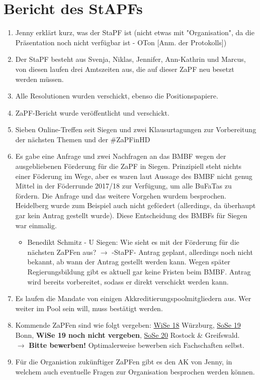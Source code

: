 \section{Bericht des StAPFs}
  \begin{enumerate}
    \item Jenny erklärt kurz, was der StaPF ist (nicht etwas mit "Organisation", da die Präsentation noch nicht verfügbar ist - OTon [Anm. der Protokolls])
    \item Der StaPF besteht aus Svenja, Niklas, Jennifer, Ann-Kathrin und Marcus, von diesen laufen drei Amtszeiten aus, die auf dieser ZaPF neu besetzt werden müssen.
    \item Alle Resolutionen wurden verschickt, ebenso die Positionspapiere.
    \item ZaPF-Bericht wurde veröffentlicht und verschickt.
    \item Sieben Online-Treffen seit Siegen und zwei Klausurtagungen zur Vorbereitung der nächsten Themen und der \#ZaPFinHD
    \item Es gabe eine Anfrage und zwei Nachfragen an das BMBF wegen der ausgebliebenen Förderung für die ZaPF in Siegen. Prinzipiell steht nichts einer Föderung im Wege,
      aber es waren laut Aussage des BMBF nicht genug Mittel in der Föderrunde 2017/18 zur Verfügung, um alle BuFaTas zu fördern. Die Anfrage und das weitere Vorgehen wurdem besprochen.
      Heidelberg wurde zum Beispiel auch nicht gefördert (allerdings, da überhaupt gar kein Antrag gestellt wurde). Diese Entscheidung des BMBFs für Siegen war einmalig.
      \begin{itemize}
        \item Benedikt Schmitz - U Siegen:  Wie sieht es mit der Förderung für die nächsten ZaPFen aus? $\rightarrow$ -StaPF- Antrag geplant, allerdings noch nicht bekannt, ab wann der Antrag gestellt werden kann. Wegen später Regierungsbildung gibt es aktuell gar keine Fristen beim BMBF. Antrag wird bereits vorbereitet, sodass er direkt verschickt werden kann.
      \end{itemize}
    \item Es laufen die Mandate von einigen Akkreditierungspoolmitgliedern aus. Wer weiter im Pool sein will, muss bestätigt werden.
    \item Kommende ZaPFen sind wie folgt vergeben: \underline{WiSe 18} Würzburg, \underline{SoSe 19} Bonn, \textbf{WiSe 19 noch nicht vergeben}, \underline{SoSe 20} Rostock \& Greifswald. \\ $\rightarrow$ \textbf{Bitte bewerben!} Optimalerweise bewerben sich Fachschaften selbst.
    \item Für die Organistion zukünftiger ZaPFen gibt es den AK von Jenny, in welchem auch eventuelle Fragen zur Organisation besprochen werden können.
  \end{enumerate}

